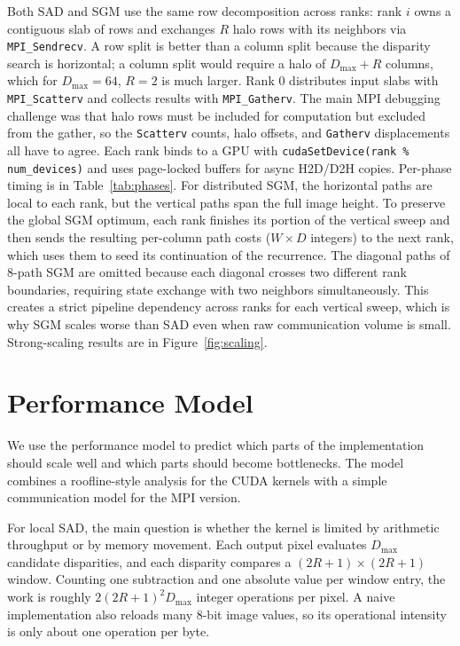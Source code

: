 \documentclass[11pt]{article}
\begin{document}
Both SAD and SGM use the same row decomposition across ranks: rank $i$ owns a
contiguous slab of rows and exchanges $R$ halo rows with its neighbors via \texttt{MPI\_Sendrecv}. A row
split is better than a column split because the disparity search is horizontal;
a column split would require a halo of $D_{\max}+R$ columns, which for
$D_{\max}=64$, $R=2$ is much larger. Rank 0 distributes input slabs with
\texttt{MPI\_Scatterv} and collects results with \texttt{MPI\_Gatherv}. The main
MPI debugging challenge was that halo rows must be included for computation but
excluded from the gather, so the \texttt{Scatterv} counts, halo offsets, and
\texttt{Gatherv} displacements all have to agree. Each rank binds to a GPU with
\texttt{cudaSetDevice(rank \% num\_devices)} and uses page-locked buffers for
async H2D/D2H copies. Per-phase timing is in Table~\ref{tab:phases}. For distributed SGM, the horizontal paths are local to each rank, but the
vertical paths span the full image height. To preserve the global SGM optimum,
each rank finishes its portion of the vertical sweep and then sends the resulting
per-column path costs ($W\times D$ integers) to the next rank, which uses them
to seed its continuation of the recurrence. The diagonal paths of 8-path SGM are
omitted because each diagonal crosses two different rank boundaries, requiring
state exchange with two neighbors simultaneously. This creates a
strict pipeline dependency across ranks for each vertical sweep, which is why
SGM scales worse than SAD even when raw communication volume is small.
Strong-scaling results are in Figure~\ref{fig:scaling}.

\section{Performance Model}
\label{sec:model}

We use the performance model to predict which parts of the implementation should
scale well and which parts should become bottlenecks. The model combines a
roofline-style analysis for the CUDA kernels with a simple communication model
for the MPI version.

For local SAD, the main question is whether the kernel is limited by arithmetic
throughput or by memory movement. Each output pixel evaluates $D_{\max}$
candidate disparities, and each disparity compares a $(2R+1)\times(2R+1)$
window. Counting one subtraction and one absolute value per window entry, the
work is roughly $2(2R+1)^2D_{\max}$ integer operations per pixel. A naive implementation also reloads many 8-bit
image values, so its operational intensity is only about one operation per byte.
\end{document}
